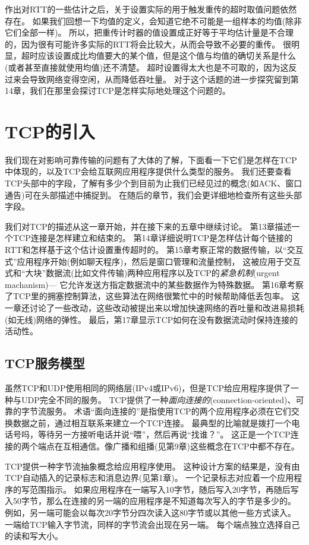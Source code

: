 \documentclass{../main.tex}{subfiles}
\begin{document}
作出对RTT的一些估计之后，关于设置实际的用于触发重传的超时取值问题依然存在。
如果我们回想一下均值的定义，会知道它绝不可能是一组样本的均值(除非它们全部一样)。
所以，把重传计时器的值设置成正好等于平均估计量是不合理的，因为很有可能许多实际的RTT将会比较大，从而会导致不必要的重传。
很明显，超时应该设置成比均值要大的某个值，但是这个值与均值的确切关系是什么(或者甚至直接就使用均值)还不清楚。
超时设置得太大也是不可取的，因为这反过来会导致网络变得空闲，从而降低吞吐量。
对于这个话题的进一步探究留到第14章，我们在那里会探讨TCP是怎样实际地处理这个问题的。

\section{TCP的引入}
我们现在对影响可靠传输的问题有了大体的了解，下面看一下它们是怎样在TCP中体现的，以及TCP会给互联网应用程序提供什么类型的服务。
我们还要查看TCP头部中的字段，了解有多少个到目前为止我们已经见过的概念(如ACK、窗口通告)可在头部描述中捕捉到。
在随后的章节，我们会更详细地检查所有这些头部字段。

我们对TCP的描述从这一章开始，并在接下来的五章中继续讨论。
第13章描述一个TCP连接是怎样建立和结束的。
第14章详细说明TCP是怎样估计每个链接的RTT和怎样基于这个估计设置重传超时的。
第15章考察正常的数据传输，以``交互式''应用程序开始(例如聊天程序)，然后是窗口管理和流量控制，
这被应用于交互式和``大块''数据流(比如文件传输)两种应用程序以及TCP的\emph{紧急机制}(urgent machanism)---
它允许发送方指定数据流中的某些数据作为特殊数据。
第16章考察了TCP里的拥塞控制算法，这些算法在网络很繁忙中的时候帮助降低丢包率。
这一章还讨论了一些改动，这些改动被提出来以增加快速网络的吞吐量和改进易损耗(如无线)网络的弹性。
最后，第17章显示TCP如何在没有数据流动时保持连接的活动性。

\subsection{TCP服务模型}
虽然TCP和UDP使用相同的网络层(IPv4或IPv6)，但是TCP给应用程序提供了一种与UDP完全不同的服务。
TCP提供了一种\emph{面向连接的}(connection-oriented)、可靠的字节流服务。
术语``面向连接的''是指使用TCP的两个应用程序必须在它们交换数据之前，通过相互联系来建立一个TCP连接。
最典型的比喻就是拨打一个电话号吗，等待另一方接听电话并说``喂''，然后再说``找谁？''。
这正是一个TCP连接的两个端点在互相通信。像广播和组播(见第9章)这些概念在TCP中都不存在。

TCP提供一种字节流抽象概念给应用程序使用。
这种设计方案的结果是，没有由TCP自动插入的记录标志和消息边界(见第1章)。
一个记录标志对应着一个应用程序的写范围指示。
如果应用程序在一端写入10字节，随后写入20字节，再随后写入50字节，那么在连接的另一端的应用程序是不知道每次写入的字节是多少的。
例如，另一端可能会以每次20字节分四次读入这80字节或以其他一些方式读入。
一端给TCP输入字节流，同样的字节流会出现在另一端。
每个端点独立选择自己的读和写大小。
\end{document}

